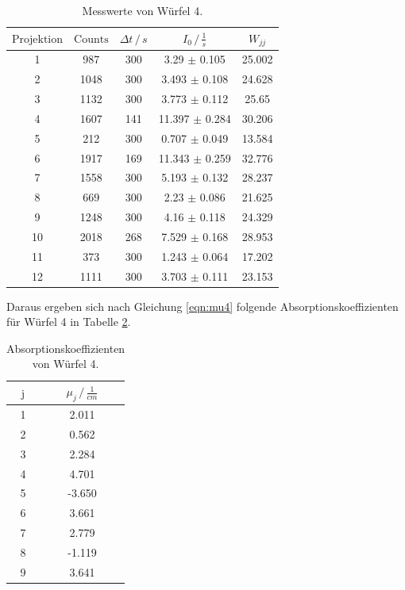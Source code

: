     \begin{table}
      \centering
      \begin{tabular}{c c c c c}
      \toprule
      $\text{Projektion}$ & $\text{Counts}$ & $\Delta t \,/\, s $ & $I_0 \,/\, \frac{1}{s} $ & $W_{jj}$\\
       \midrule 
    1  & 987  & 300 & 3.29  $\pm$ 0.105   & 25.002 \\
    2  & 1048 & 300 &   3.493 $\pm$ 0.108 &  24.628 \\
    3  & 1132 & 300 &  3.773 $\pm$ 0.112  & 25.65 \\
    4  & 1607 & 141 &  11.397 $\pm$ 0.284 &  30.206 \\
    5  & 212  & 300 &  0.707 $\pm$ 0.049  & 13.584 \\
    6  & 1917 & 169 &  11.343 $\pm$ 0.259 &  32.776 \\
    7  & 1558 & 300 & 5.193  $\pm$ 0.132  & 28.237 \\
    8  & 669  & 300 & 2.23  $\pm$ 0.086   &  21.625\\
    9  & 1248 & 300 &   4.16 $\pm$ 0.118  &  24.329\\
    10 &  2018 & 268 & 7.529 $\pm$  0.168 & 28.953  \\
    11 &  373  & 300 & 1.243 $\pm$ 0.064  & 17.202 \\
    12 &  1111 & 300 & 3.703 $\pm$ 0.111  & 23.153 \\
      \bottomrule
      \end{tabular}
      \caption{Messwerte von Würfel 4.}
      \label{tab:w4}
      \end{table}

\noindent
Daraus ergeben sich nach Gleichung \ref{eqn:mu4} folgende Absorptionskoeffizienten für Würfel 4 in Tabelle \ref{tab:muj}.

    \begin{table}
      \centering
      \begin{tabular}{c c}
      \toprule
      $\text{j}$ & $\mu_j \,/\, \frac{1}{cm}$ \\
       \midrule 
    1  & 2.011  \\
    2  & 0.562  \\
    3  & 2.284   \\
    4  & 4.701  \\
    5  & -3.650   \\
    6  & 3.661  \\
    7  & 2.779   \\
    8  & -1.119  \\
    9  & 3.641   \\

      \bottomrule
      \end{tabular}
      \caption{Absorptionskoeffizienten von Würfel 4.}
      \label{tab:muj}
      \end{table}